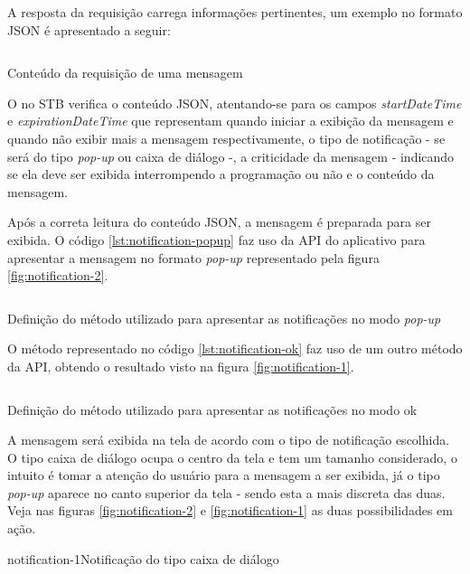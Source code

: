 A resposta da requisição carrega informações pertinentes, um exemplo no formato
JSON é apresentado a seguir:

\begin{listing}[ht!]
\inputminted{json}{codigos/message.json}
\caption{Conteúdo da requisição de uma mensagem}
\label{lst:notification-json}
\end{listing}

O \software[] no STB verifica o conteúdo JSON, atentando-se para os campos 
\textit{startDateTime} e \textit{expirationDateTime} que representam quando 
iniciar a exibição da mensagem e quando não exibir mais a mensagem 
respectivamente, o tipo de notificação - se será do tipo \textit{pop-up} ou
caixa de diálogo -, a criticidade da mensagem - indicando se ela deve ser
exibida interrompendo a programação ou não e o conteúdo da mensagem. 

Após a correta leitura do conteúdo JSON, a mensagem é preparada para ser 
exibida. O código \ref{lst:notification-popup} faz uso da API do aplicativo
\xbmc[] para apresentar a mensagem no formato \textit{pop-up} representado pela
figura \ref{fig:notification-2}.

\begin{listing}[ht!]
\inputminted{python}{codigos/notification-popup.py}
\caption{Definição do método utilizado para apresentar as notificações no modo
\textit{pop-up}}
\label{lst:notification-popup}
\end{listing}

O método representado no código \ref{lst:notification-ok} faz uso de um outro 
método da API, obtendo o resultado visto na figura \ref{fig:notification-1}.

\begin{listing}[ht!]
\inputminted{python}{codigos/notification-ok.py}
\caption{Definição do método utilizado para apresentar as notificações no modo
ok}
\label{lst:notification-ok}
\end{listing}

A mensagem será exibida na tela de acordo com o tipo de notificação escolhida. O
tipo caixa de diálogo ocupa o centro da tela e tem um tamanho considerado, o 
intuito é tomar a atenção do usuário para a mensagem a ser exibida, já o tipo
\textit{pop-up} aparece no canto superior da tela - sendo esta a mais discreta 
das duas. Veja nas figuras \ref{fig:notification-2} e \ref{fig:notification-1} 
as duas possibilidades em ação.

{notification-1}{Notificação do tipo caixa de diálogo}

